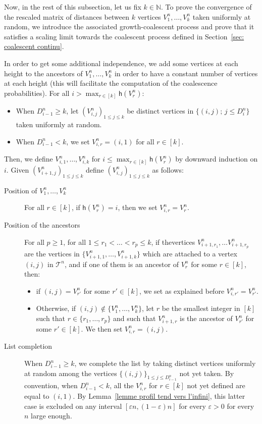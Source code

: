 \documentclass[AHL,Unicode,published]{cedram}
\newcommand{\e}{\varepsilon}
\newcommand{\N}{\mathbb{N}}
\newcommand{\1}{\mathbbm{1}}
\newcommand{\T}{\mathcal{T}}
\newcommand{\h}{\mathsf{h}}
\begin{document}
Now, {in the rest of this subsection, let us fix $k \in \N$}. To prove the convergence of the rescaled matrix of distances between $k$ vertices $V^n_1,\dots, V^n_k$ taken uniformly at random, we introduce the associated growth-coalescent process and prove that it satisfies a scaling limit towards the coalescent process defined in Section~\ref{sec: coalescent continu}.

In order to get some additional independence, we add some vertices at each height to the ancestors of $V^n_1,\dots, V^n_k$ in order to have a constant number of vertices at each height {(this will facilitate the computation of the coalescence probabilities)}. For all $i> \max_{r \in [k]} \h(V^n_r)$:
\begin{itemize}
\item When $D^n_{i-1} \ge k$, let $(V^n_{i,j})_{1\leq j \leq k}$ be distinct vertices in $\{ (i,j); \, j \le D^n_i \}$ taken uniformly at random.
\item When $D^n_{i-1} < k$, we set $V^n_{i,r} = (i, 1)$ for all $r \in [k]$.
\end{itemize}
Then, we define $V^n_{i,1}, \dots, V^n_{i,k}$ for $i \le \max_{r \in [k]} \h(V^n_r)$ by downward induction on $i$. Given $(V^n_{i+1,j})_{1\leq j \leq k}$ define $(V^n_{i,j})_{1\leq j \leq k}$ as follows:
\begin{description}
\item[Position of $V^n_{1},\dots, V^n_k$] For all $r \in [k]$, if $\h(V^n_r) = i$, then we set $V^n_{i,r}= V^n_r$.
\item[Position of the ancestors] For all $p \ge 1$, for all $1 \le r_1 < \dots <r_p \le k$, if the\linebreak ver\-tices $V^n_{i+1, r_1}, \dots V^n_{i+1,r_p}$ are the vertices in $\{V^n_{i+1,1}, \dots, V^n_{i+1,k} \}$ which are attached to a vertex $(i,j)$ in $\T^n$, and if one of them is an ancestor of $V^n_r$ for some $r \in [k]$, then:
\begin{itemize}
\item if $(i,j) = V^n_{r'}$ for some $r' \in [k]$, we set as explained before $V^n_{i,r'} = V^n_{r'}$.
\item Otherwise, if $(i,j) \not \in \{V_1^n, \dots, V^n_k\}$, let $r$ be the smallest integer in $[k]$ such that $r \in \{r_1, \dots, r_p \}$ and such that $V^n_{i+1,r}$ is the ancestor of $V^n_{r'}$ for some $r' \in [k]$. We then set $V^n_{i,r} = (i,j)$.
\end{itemize}
\item[List completion] When $D^n_{i-1} \ge k$, we complete the list by taking distinct vertices uniformly at random among the vertices $\{(i,j)\}_{1\leq j\leq D^n_{i-1}}$ not yet taken. By convention, when $D^n_{i-1} <k$, all the $V^n_{i,r}$ for $r \in [k]$ not yet defined are equal to $(i,1)$. By Lemma~\ref{lemme profil tend vers l'infini}, this latter case is excluded on any interval $[\e n, (1-\e)n]$ for every $\e>0$ for every $n$ large enough.
\end{description}
\end{document}
